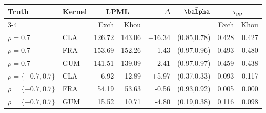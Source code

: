 \begin{tabular}{llrrrrrr}
\hline\hline
Truth & Kernel & \multicolumn{2}{c}{LPML} & $\Delta$ & $\bar\balpha$ & \multicolumn{2}{c}{$\tau_{\rm pp}$} \\
\cline{3-4}\cline{7-8}
 & & Exch & Khou & & & Exch & Khou \\
\hline
$\rho=0.7$ & CLA & 126.72 & 143.06 & +16.34 & (0.85,0.78) & 0.428 & 0.427 \\
$\rho=0.7$ & FRA & 153.69 & 152.26 & -1.43 & (0.97,0.96) & 0.493 & 0.480 \\
$\rho=0.7$ & GUM & 141.51 & 139.09 & -2.41 & (0.97,0.97) & 0.459 & 0.438 \\
$\rho=\{-0.7,0.7\}$ & CLA & 6.92 & 12.89 & +5.97 & (0.37,0.33) & 0.093 & 0.117 \\
$\rho=\{-0.7,0.7\}$ & FRA & 54.19 & 53.63 & -0.56 & (0.93,0.92) & 0.005 & 0.000 \\
$\rho=\{-0.7,0.7\}$ & GUM & 15.52 & 10.71 & -4.80 & (0.19,0.38) & 0.116 & 0.098 \\
\hline\hline
\end{tabular}
